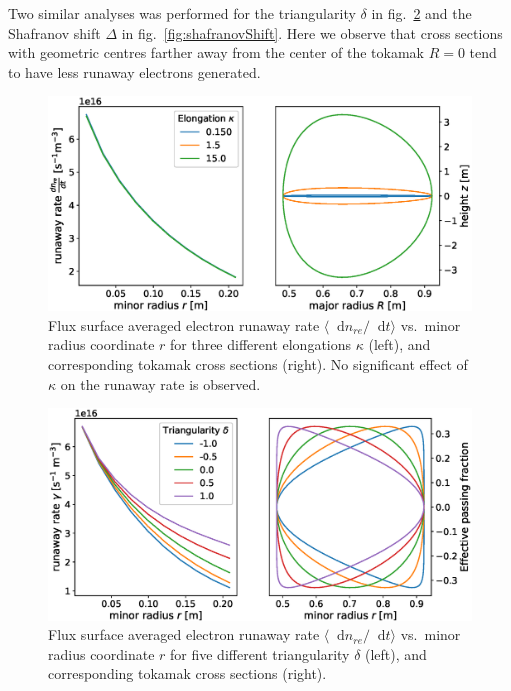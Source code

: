 \documentclass[11pt,a4paper]{article}
\newcommand*\diff{\mathop{}\!\mathrm{d}}
\begin{document}
Two similar analyses was performed for the triangularity $\delta$ in fig.\ \ref{fig:triangularity} and the Shafranov shift $\Delta$ in fig.\ \ref{fig:shafranovShift}.
Here we observe that cross sections with geometric centres farther away from the center of the tokamak $R=0$ tend to have less runaway electrons generated.

\begin{figure}[H]
    \centering
    \captionsetup{width=.8\textwidth}
    \includegraphics[width=\textwidth]{figs/elongation.eps}
    \caption{Flux surface averaged electron runaway rate $\langle\diff{n}_{re}/\diff{t}\rangle$ vs.\ minor radius coordinate $r$ for three different elongations $\kappa$ (left), and corresponding tokamak cross sections (right).
    No significant effect of $\kappa$ on the runaway rate is observed.}
    \label{fig:elongation}
\end{figure}

\begin{figure}[H]
    \centering
    \captionsetup{width=.8\textwidth}
    \includegraphics[width=\textwidth]{figs/triangularity.eps}
    \caption{Flux surface averaged electron runaway rate $\langle\diff{n}_{re}/\diff{t}\rangle$ vs.\ minor radius coordinate $r$ for five different triangularity $\delta$ (left), and corresponding tokamak cross sections (right).}
    \label{fig:triangularity}
\end{figure}
\end{document}
